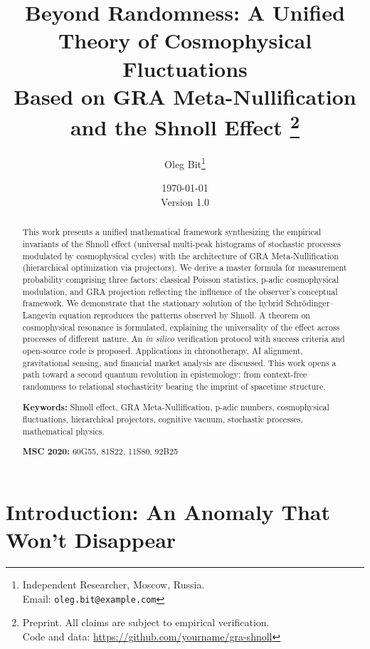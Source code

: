\documentclass[12pt,a4paper]{article}
\title{
    \textbf{Beyond Randomness: A Unified Theory of Cosmophysical Fluctuations \\ Based on GRA Meta-Nullification and the Shnoll Effect}
    \thanks{Preprint. All claims are subject to empirical verification. \\
    Code and data: \url{https://github.com/yourname/gra-shnoll}}
}
\author{
    Oleg Bit\thanks{Independent Researcher, Moscow, Russia. \\
    Email: \texttt{oleg.bit@example.com}}
}
\date{
    \today \\
    \small{Version 1.0}
}
\theoremstyle{plain}
\theoremstyle{definition}
\theoremstyle{remark}
\begin{document}
\maketitle

\begin{abstract}
\noindent
This work presents a unified mathematical framework synthesizing the empirical invariants of the Shnoll effect (universal multi-peak histograms of stochastic processes modulated by cosmophysical cycles) with the architecture of GRA Meta-Nullification (hierarchical optimization via projectors). We derive a master formula for measurement probability comprising three factors: classical Poisson statistics, p-adic cosmophysical modulation, and GRA projection reflecting the influence of the observer's conceptual framework. We demonstrate that the stationary solution of the hybrid Schrödinger--Langevin equation reproduces the patterns observed by Shnoll. A theorem on cosmophysical resonance is formulated, explaining the universality of the effect across processes of different nature. An \textit{in silico} verification protocol with success criteria and open-source code is proposed. Applications in chronotherapy, AI alignment, gravitational sensing, and financial market analysis are discussed. This work opens a path toward a second quantum revolution in epistemology: from context-free randomness to relational stochasticity bearing the imprint of spacetime structure.

\medskip
\noindent\textbf{Keywords:} Shnoll effect, GRA Meta-Nullification, p-adic numbers, cosmophysical fluctuations, hierarchical projectors, cognitive vacuum, stochastic processes, mathematical physics.

\medskip
\noindent\textbf{MSC 2020:} 60G55, 81S22, 11S80, 92B25
\end{abstract}

\section{Introduction: An Anomaly That Won't Disappear}
\label{sec:intro}
\end{document}
